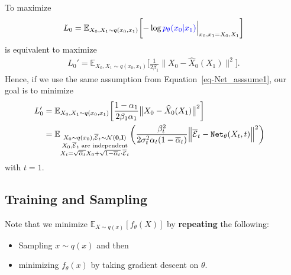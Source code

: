 \documentclass[
]{article}
\providecommand{\tightlist}{%
  \setlength{\itemsep}{0pt}\setlength{\parskip}{0pt}}\usepackage{longtable,booktabs,array}
\theoremstyle{remark}
\begin{document}
\begin{itemize}
\[  \] To maximize \[
  \begin{aligned}
    L_0
    = \mathbb E_{X_0,X_1\sim q(x_0,x_1)} \biggl[ 
      -\log {\color{blue}{p_{\theta}(x_0 \vert x_1)}} \Big\vert_{x_0,x_1=X_0,X_1}
      \biggr]
  \end{aligned}
  \] is equivalent to maximize \[
  \begin{aligned}
    L_0'=\mathbb E_{X_0,X_1\sim q(x_0,x_1)} \biggl[
      \frac{1}{2\beta_1} \big\lVert X_0 - \widehat{X}_0(X_1) \big\rVert^2
      \biggr].
  \end{aligned}
  \] Hence, if we use the same assumption from
  Equation~\ref{eq-Net_asssume1}, our goal is to minimize \[
  \begin{aligned}
    L_0' &=  \mathbb E_{X_0,X_1\sim q(x_0,x_1)} \biggl[
      \frac{1-\alpha_1}{2\beta_1 \alpha_1} 
      \big\lVert X_0 - \widehat{X}_0(X_1)  
      \big\rVert^2
      \biggr]  \cr
      &=
      \mathbb E_{\substack{X_0\sim q(x_0), \overline{\mathcal{E}}_t\sim \mathcal{N}(\mathbf{0},\mathbf{I})\\ X_0,\overline{\mathcal{E}}_t \text{ are independent} \\ X_t=\sqrt{\overline{\alpha}_t}X_0+\sqrt{1-\overline{\alpha}_t}\cdot \overline{\mathcal{E}}_t}} \biggl( \frac{\beta_t^2}{2\sigma_t^2\alpha_t(1-\overline{\alpha}_t)} \Big\lVert \overline{\mathcal{E}}_t - \mathtt{Net}_{\theta}(X_t,t) \Big\rVert^2 \biggr)
  \end{aligned}
  \] with \(t=1.\)
\end{itemize}

\subsection{Training and Sampling}\label{training-and-sampling}

Note that we minimize \(\mathbb E_{X\sim q(x)}[f_{\theta}(X)]\) by
\textbf{repeating} the following:

\begin{itemize}
\tightlist
\item
  Sampling \(x\sim q(x)\) and then
\item
  minimizing \(f_{\theta}(x)\) by taking gradient descent on \(\theta.\)
\end{itemize}
\end{document}
